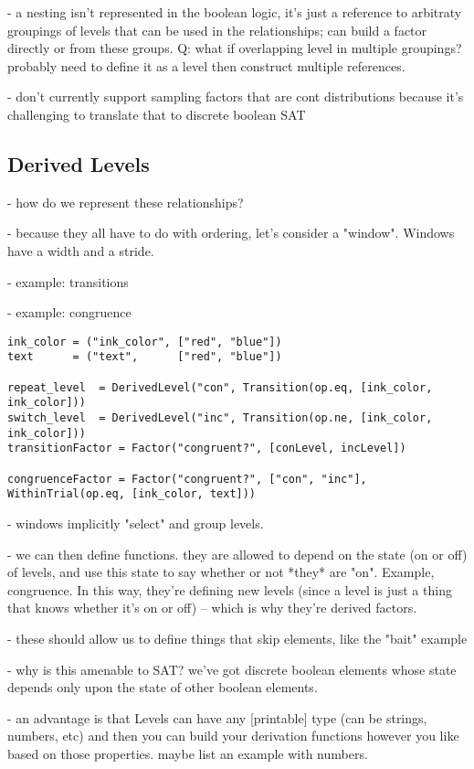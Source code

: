 - a nesting isn't represented in the boolean logic, it's just a reference to arbitraty groupings of levels that can be used in the relationships; can build a factor directly or from these groups. Q: what if overlapping level in multiple groupings? probably need to define it as a level then construct multiple references.

- don't currently support sampling factors that are cont distributions because it's challenging to translate that to discrete boolean SAT

\subsection{Derived Levels}
- how do we represent these relationships?

- because they all have to do with ordering, let's consider a "window". Windows have a width and a stride.

- example: transitions

- example: congruence

\begin{lstlisting}
ink_color = ("ink_color", ["red", "blue"])
text      = ("text",      ["red", "blue"])

repeat_level  = DerivedLevel("con", Transition(op.eq, [ink_color, ink_color]))
switch_level  = DerivedLevel("inc", Transition(op.ne, [ink_color, ink_color]))
transitionFactor = Factor("congruent?", [conLevel, incLevel])

congruenceFactor = Factor("congruent?", ["con", "inc"], WithinTrial(op.eq, [ink_color, text]))

\end{lstlisting}

- windows implicitly "select" and group levels.

- we can then define functions. they are allowed to depend on the state (on or off) of levels, and use this state to say whether or not *they* are "on". Example, congruence. In this way, they're defining new levels (since a level is just a thing that knows whether it's on or off) -- which is why they're derived factors.

- these should allow us to define things that skip elements, like the "bait" example

- why is this amenable to SAT? we've got discrete boolean elements whose state depends only upon the state of other boolean elements.

- an advantage is that Levels can have any [printable] type (can be strings, numbers, etc) and then you can build your derivation functions however you like based on those properties. maybe list an example with numbers.

